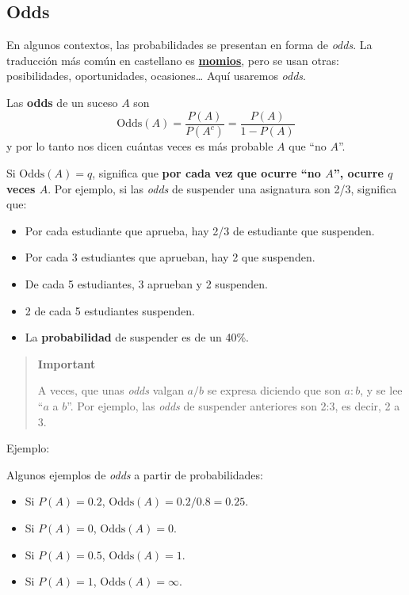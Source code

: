\documentclass[
  spanish,
  letterpaper,
  DIV=11,
  numbers=noendperiod]{scrreprt}
\providecommand{\tightlist}{%
  \setlength{\itemsep}{0pt}\setlength{\parskip}{0pt}}
\begin{document}
\begin{tcolorbox}
\subsection{Odds}\label{odds}

En algunos contextos, las probabilidades se presentan en forma de
\emph{odds}. La traducción más común en castellano es
\href{https://es.wikipedia.org/wiki/Apuesta_deportiva\#Momios_o_Cuotas_Deportivas}{\textbf{momios}},
pero se usan otras: posibilidades, oportunidades, ocasiones\ldots{} Aquí
usaremos \emph{odds}.

Las \textbf{odds} de un suceso \(A\) son \[
\text{Odds}(A)=\frac{P(A)}{P(A^c)}=\frac{P(A)}{1-P(A)}
\] y por lo tanto nos dicen cuántas veces es más probable \(A\) que ``no
\(A\)''.

Si \(\text{Odds}(A)=q\), significa que \textbf{por cada vez que ocurre
``no \(A\)'', ocurre \(q\) veces \(A\)}. Por ejemplo, si las \emph{odds}
de suspender una asignatura son 2/3, significa que:

\begin{itemize}
\item
  Por cada estudiante que aprueba, hay 2/3 de estudiante que suspenden.
\item
  Por cada 3 estudiantes que aprueban, hay 2 que suspenden.
\item
  De cada 5 estudiantes, 3 aprueban y 2 suspenden.
\item
  2 de cada 5 estudiantes suspenden.
\item
  La \textbf{probabilidad} de suspender es de un 40\%.
\end{itemize}

\begin{quote}
\textbf{Important}

A veces, que unas \emph{odds} valgan \(a/b\) se expresa diciendo que son
\(a\!:\!b\), y se lee ``\(a\) a \(b\)''. Por ejemplo, las \emph{odds} de
suspender anteriores son 2:3, es decir, 2 a 3.
\end{quote}

Ejemplo:

Algunos ejemplos de \emph{odds} a partir de probabilidades:

\begin{itemize}
\tightlist
\item
  Si \(P(A)=0.2\), \(\text{Odds}(A)=0.2/0.8=0.25\).
\item
  Si \(P(A)=0\), \(\text{Odds}(A)=0\).
\item
  Si \(P(A)=0.5\), \(\text{Odds}(A)=1\).
\item
  Si \(P(A)=1\), \(\text{Odds}(A)=\infty\).
\end{itemize}


\end{tcolorbox}
\end{document}
